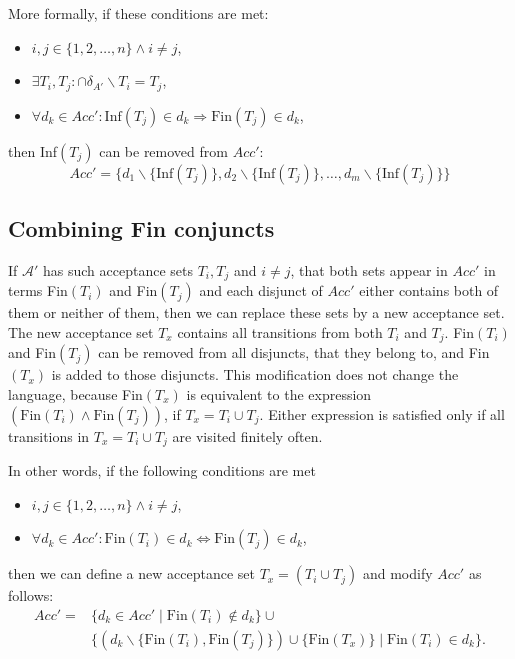 \documentclass[
  digital, %
  twoside, %
  table,   %
  lof,     %
  lot,     %
]{fithesis3}
\begin{document}
More formally, if these conditions are met:
\begin{itemize}
  \item $i, j \in \{1, 2, \dots, n\} \wedge i \neq j$,
  \item $\exists T_i, T_j \colon \cap \delta_{A'} \smallsetminus T_i = T_j$,
  \item $\forall d_k \in Acc' \colon \text{Inf}(T_j) \in d_k \Rightarrow \text{Fin}(T_j) \in d_k$,
\end{itemize}
then Inf$(T_j)$ can be removed from $Acc'$:
\begin{equation*}
  Acc' = \{d_1 \smallsetminus \{\text{Inf}(T_j)\}, d_2 \smallsetminus \{\text{Inf}(T_j)\}, \dots, d_m \smallsetminus \{\text{Inf}(T_j)\} \}
\end{equation*}

\subsection{Combining Fin conjuncts}
If $\mathcal{A'}$ has such acceptance sets $T_i, T_j$ and $i \neq j$, that both sets appear in $Acc'$ in terms Fin$(T_i)$ and Fin$(T_j)$ and each disjunct of $Acc'$ either contains both of them or neither of them, then we can replace these sets by a new acceptance set. The new acceptance set $T_x$ contains all transitions from both $T_i$ and $T_j$. Fin$(T_i)$ and Fin$(T_j)$ can be removed from all disjuncts, that they belong to, and Fin$(T_x)$ is added to those disjuncts. This modification does not change the language, because Fin$(T_x)$ is equivalent to the expression $(\text{Fin}(T_i) \wedge \text{Fin}(T_j))$, if $T_x = T_i \cup T_j$. Either expression is satisfied only if all transitions in $T_x = T_i \cup T_j$ are visited finitely often.

In other words, if the following conditions are met
\begin{itemize}
  \item $i, j \in \{1, 2, \dots, n\} \wedge i \neq j$,
  \item $\forall d_k \in Acc' \colon \text{Fin}(T_i) \in d_k \Leftrightarrow \text{Fin}(T_j) \in d_k$,
\end{itemize}
then we can define a new acceptance set $T_x = (T_i \cup T_j)$ and modify $Acc'$ as follows: 
\begin{align*}
  Acc' =& \{d_k \in Acc' \mid \text{Fin}(T_i) \notin d_k\} \cup \\ &\{(d_k \smallsetminus \{\text{Fin}(T_i), \text{Fin}(T_j)\}) \cup \{\text{Fin}(T_x)\} \mid \text{Fin}(T_i) \in d_k\}.
\end{align*}
\end{document}
